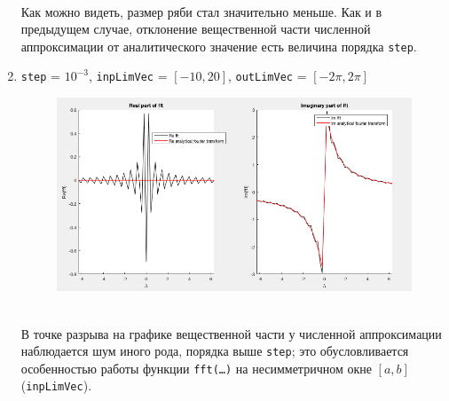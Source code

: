 \documentclass[11pt, oneside, final]{article}
\numberwithin{equation}{section}
\begin{document}
\begin{enumerate}
\begin{figure}[!h]
            \label{pic:f2:2}
        \end{figure} \\
        Как можно видеть, размер ряби стал значительно меньше. Как и в предыдущем случае, отклонение вещественной части численной аппроксимации от аналитического значение
        есть величина порядка \texttt{step}.
        \clearpage
        \item
        \label{it:fftnoise}
        \texttt{step} = \(10^{-3}\), \texttt{inpLimVec} = \( [-10, 20] \), \texttt{outLimVec} = \( [-2\pi, 2\pi] \)
        \begin{figure}[!h]
            \centering
            \includegraphics[width=\linewidth]{f2fig3}
            \label{pic:f2:3}
        \end{figure} \\
        В точке разрыва на графике вещественной части у численной аппроксимации наблюдается шум иного рода, порядка выше \texttt{step}; 
        это обусловливается особенностью работы функции \texttt{fft(\dots)} на несимметричном окне \([a, b]\) (\texttt{inpLimVec}).
    \end{enumerate}
    \clearpage
    
\end{document}
